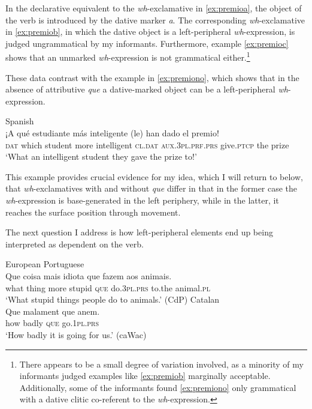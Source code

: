 In the declarative equivalent to the \textit{wh}-exclamative in \eqref{ex:premioa}, the object of the verb is introduced by the dative marker \emph{a}. The corresponding \textit{wh}-exclamative in \eqref{ex:premiob}, in which the dative object is a left-peripheral \textit{wh}-expression, is judged ungrammatical by my informants. Furthermore, example \eqref{ex:premioc}  shows that an unmarked \textit{wh}-expression is  not grammatical either.\footnote{There appears to be a small degree of variation involved, as a minority of my informants judged examples like \eqref{ex:premiob} marginally acceptable. Additionally, some of the informants found \eqref{ex:premiono} only grammatical with a dative clitic co-referent to the \textit{wh}-expression.}

These data contrast with the example in  \eqref{ex:premiono}, which shows that in the absence of attributive \emph{que} a dative-marked object can be a left-peripheral \textit{wh}-expression. 

\ea Spanish\label{ex:premiono}\\
\gll  ¡A qué estudiante más inteligente (le) han dado el premio! \\
\textsc{dat} which student more intelligent \textsc{cl.dat} \textsc{aux.3pl.prf.prs} give.\textsc{ptcp} the prize\\
\glt `What an intelligent student they gave the prize to!' 
\z

This example provides crucial evidence for my idea, which I will return to below, that \textit{wh}-exclamatives with and without \emph{que} differ in that in the former case the \textit{wh}-expression is base-generated in the left periphery, while in the latter, it reaches the surface  position through movement.


The next question I address is how left-peripheral elements end up being interpreted as dependent on the verb.\largerpage

\ea 
\ea\label{ex:whtheta}
European Portuguese\\ 
\gll  Que coisa mais idiota que fazem aos animais. \\
what thing more stupid \textsc{que} do.\textsc{3pl.prs} to.the animal.\textsc{pl}\\
\glt `What stupid things people do to animals.' (CdP)
\ex \label{ex:whmod}
Catalan\\
\gll Que malament que anem. \\
how badly \textsc{que} go.\textsc{1pl.prs}\\
\glt `How badly it is going for us.' (caWac)
\z
\z



